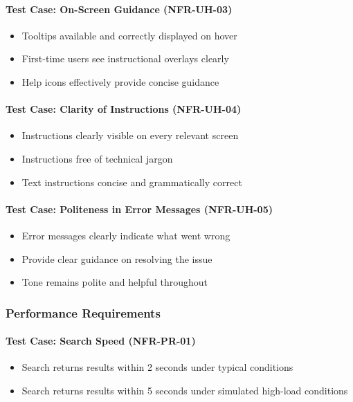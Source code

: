 \documentclass[12pt, titlepage]{article}
\begin{document}
\paragraph{Test Case: On-Screen Guidance (NFR-UH-03)}
\begin{itemize}
    \item Tooltips available and correctly displayed on hover
    \item First-time users see instructional overlays clearly
    \item Help icons effectively provide concise guidance
\end{itemize}

\paragraph{Test Case: Clarity of Instructions (NFR-UH-04)}
\begin{itemize}
    \item Instructions clearly visible on every relevant screen
    \item Instructions free of technical jargon
    \item Text instructions concise and grammatically correct
\end{itemize}

\paragraph{Test Case: Politeness in Error Messages (NFR-UH-05)}
\begin{itemize}
    \item Error messages clearly indicate what went wrong
    \item Provide clear guidance on resolving the issue
    \item Tone remains polite and helpful throughout
\end{itemize}

\subsubsection{Performance Requirements}

\paragraph{Test Case: Search Speed (NFR-PR-01)}
\begin{itemize}
    \item Search returns results within 2 seconds under typical conditions
    \item Search returns results within 5 seconds under simulated high-load conditions
\end{itemize}
\end{document}
